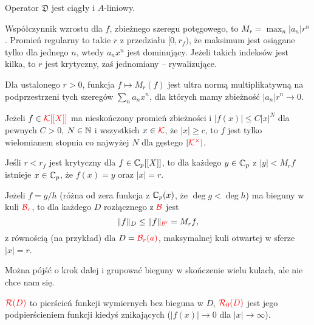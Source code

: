 \begin{fakt}
	Operator $\mathfrak D$ jest ciągły i $A$-liniowy.
\end{fakt}

\begin{definicja}
	Współczynnik wzrostu dla $f$, zbieżnego szeregu potęgowego, to $M_r = \max_n |a_n| r^n$.
	Promień regularny to takie $r$ z przedziału $[0, r_f)$, że maksimum jest osiągane tylko dla jednego $n$, wtedy $a_n x^n$ jest dominujący.
	Jeżeli takich indeksów jest kilka, to $r$ jest krytyczny, zaś jednomiany -- rywalizujące.
\end{definicja}

\begin{fakt}
	Dla ustalonego $r > 0$, funkcja $f \mapsto M_r(f)$ jest ultra normą multiplikatywną na podprzestrzeni tych szeregów $\sum_n a_n x^n$, dla których mamy zbieżność $|a_n|r^n \to 0$.
\end{fakt}

\begin{twierdzenie}[Liouville]
	Jeżeli $f \in \color{red} \mathcal K[[X]]$ ma nieskończony promień zbieżności i $|f(x)| \le C|x|^N$ dla pewnych $C > 0$, $N \in \mathbb N$ i wszystkich $x \in \color{red} \mathcal K$, że $|x| \ge c$, to $f$ jest tylko wielomianem stopnia co najwyżej $N$ dla gęstego $|\color{red} \mathcal K^\times|$.
\end{twierdzenie}

\begin{fakt}
	Jeśli $r < r_f$ jest krytyczny dla $f \in \mathbb C_p[[X]]$, to dla każdego $y \in \mathbb C_p$ z $|y| < M_rf$ istnieje $x \in \mathbb C_p$, że $f(x) = y$ oraz $|x| = r$.
\end{fakt}

\begin{fakt}
	Jeżeli $f = g/h$ (różna od zera funkcja z $\mathbb C_p(x)$, że $\deg g < \deg h$) ma bieguny w kuli $\color{red} \mathcal B_r$, to dla każdego $D$ rozłącznego z $\color{red} \mathcal B$ jest
	\[
		\|f\|_D \le \|f\|_{\color{red} \mathcal B'} = M_r f,
	\]
	z równością (na przykład) dla $D = \color{red} \mathcal B_r(a)$, maksymalnej kuli otwartej w sferze $|x| = r$.
\end{fakt}

Można pójść o krok dalej i grupować bieguny w skończenie wielu kulach, ale nie chce nam się.

\begin{definicja}
	$\color{red} \mathcal R(D)$ to pierścień funkcji wymiernych bez bieguna w $D$, $\color{red} \mathcal R_0(D)$ jest jego podpierścieniem funkcji kiedyś znikających ($|f(x)| \to 0$ dla $|x| \to \infty$).
\end{definicja}


